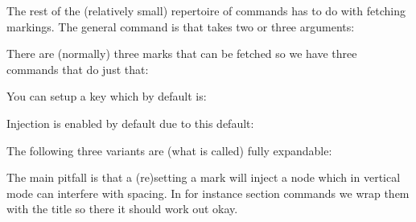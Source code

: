 The rest of the (relatively small) repertoire of commands has to do with fetching
markings. The general command is \type {\getmarking} that takes two or three
arguments:

\starttyping[option=TEX]
\getmarking[MyMarking][first]
\getmarking[MyMarking][page][first]
\getmarking[MyMarking][page][first]
\getmarking[MyMarking][column:1][first]
\stoptyping

There are (normally) three marks that can be fetched so we have three commands
that do just that:

\starttyping[option=TEX]
\fetchtwomarks[MyMarking]
\fetchallmarks[MyMarking]
\stoptyping

You can setup a  key which by default is:

\starttyping[option=TEX]
\setupmarking[MyMarking][separator=\space\emdash\space]
\stoptyping

Injection is enabled by default due to this default:

\starttyping[option=TEX]
\setupmarking[MyMarking][state=start]
\stoptyping

The following three variants are (what is called) fully expandable:

\starttyping[option=TEX]
\fetchtwomarkings[MyMarking]
\fetchallmarkings[MyMarking]
\stoptyping


\stopsectionlevel

\startsectionlevel[title=Pitfalls]

The main pitfall is that a (re)setting a mark will inject a node which in
vertical mode can interfere with spacing. In for instance section commands we
wrap them with the title so there it should work out okay.

\stopsectionlevel

\stopdocument

